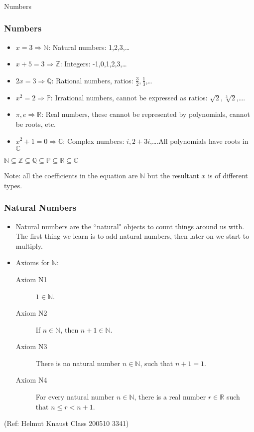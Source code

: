 \begin{frame}[fragile]\frametitle{}
\begin{center}
{\Large Numbers}
\end{center}
\end{frame}

 \begin{frame}[fragile]\frametitle{Numbers}
\begin{itemize}
\item $ x = 3 \Rightarrow \mathbb{N}$: Natural numbers: 1,2,3,\ldots
\item $ x + 5 = 3 \Rightarrow \mathbb{Z}$: Integers: -1,0,1,2,3,\ldots
\item $ 2x = 3 \Rightarrow \mathbb{Q}$: Rational numbers, ratios: $\frac{3}{2},\frac{1}{3}$,\ldots
\item $ x^2 = 2 \Rightarrow \mathbb{P}$: Irrational numbers, cannot be expressed as ratios: $\sqrt{2},\sqrt[3]{2}$,\ldots.
\item $\pi, e \Rightarrow \mathbb{R}$: Real numbers, these cannot be represented by polynomials, cannot be roots, etc.
\item $ x^2 +1 = 0 \Rightarrow \mathbb{C}$: Complex numbers: $i,2+3i$,\ldots.All polynomials have roots in $\mathbb{C}$
\end{itemize}

$\mathbb{N} \subseteq \mathbb{Z} \subseteq \mathbb{Q} \subseteq \mathbb{P} \subseteq \mathbb{R} \subseteq \mathbb{C} $

Note: all the coefficients in the equation are $\mathbb{N}$ but the resultant $x$ is of different types.
\end{frame}

 \begin{frame}[fragile]\frametitle{Natural Numbers}
\begin{itemize}
\item Natural numbers are the ``natural" objects to count things around
us with. The first thing we learn is to add natural numbers, then
later on we start to multiply.
\item Axioms for $\mathbb{N}$:
\begin{description}
\item[Axiom N1] $1\in\mathbb{N}$.
\item[Axiom N2] If $n\in\mathbb{N}$, then $n+1\in\mathbb{N}$.
\item[Axiom N3] There is no natural number $n\in\mathbb{N}$, such that $n+1=1$.
\item[Axiom N4] For every natural number $n\in\mathbb{N}$, there is a
real number $r\in\mathbb{R}$ such that $n\leq r<n+1$.
\end{description}
\end{itemize}

\tiny{(Ref: Helmut Knaust Class 200510 3341)}

\end{frame}


